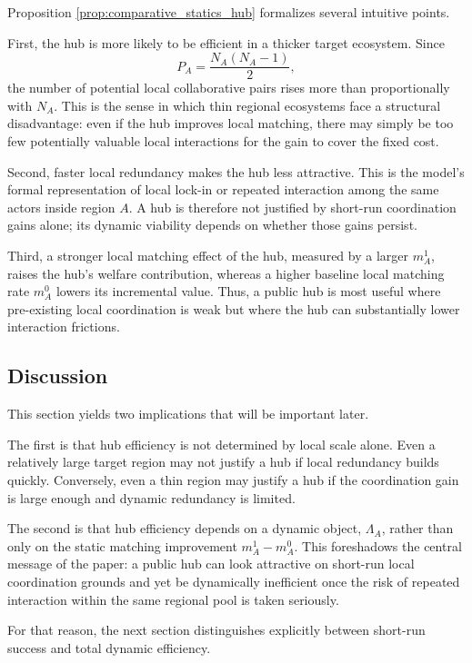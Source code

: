 Proposition \ref{prop:comparative_statics_hub} formalizes several intuitive points.

First, the hub is more likely to be efficient in a thicker target ecosystem. Since
\[
P_A=\frac{N_A(N_A-1)}{2},
\]
the number of potential local collaborative pairs rises more than proportionally with $N_A$. This is the sense in which thin regional ecosystems face a structural disadvantage: even if the hub improves local matching, there may simply be too few potentially valuable local interactions for the gain to cover the fixed cost.

Second, faster local redundancy makes the hub less attractive. This is the model's formal representation of local lock-in or repeated interaction among the same actors inside region $A$. A hub is therefore not justified by short-run coordination gains alone; its dynamic viability depends on whether those gains persist.

Third, a stronger local matching effect of the hub, measured by a larger $m_A^1$, raises the hub's welfare contribution, whereas a higher baseline local matching rate $m_A^0$ lowers its incremental value. Thus, a public hub is most useful where pre-existing local coordination is weak but where the hub can substantially lower interaction frictions.

\subsection{Discussion}

This section yields two implications that will be important later.

The first is that hub efficiency is not determined by local scale alone. Even a relatively large target region may not justify a hub if local redundancy builds quickly. Conversely, even a thin region may justify a hub if the coordination gain is large enough and dynamic redundancy is limited.

The second is that hub efficiency depends on a dynamic object, $\Lambda_A$, rather than only on the static matching improvement $m_A^1-m_A^0$. This foreshadows the central message of the paper: a public hub can look attractive on short-run local coordination grounds and yet be dynamically inefficient once the risk of repeated interaction within the same regional pool is taken seriously.

For that reason, the next section distinguishes explicitly between short-run success and total dynamic efficiency.
